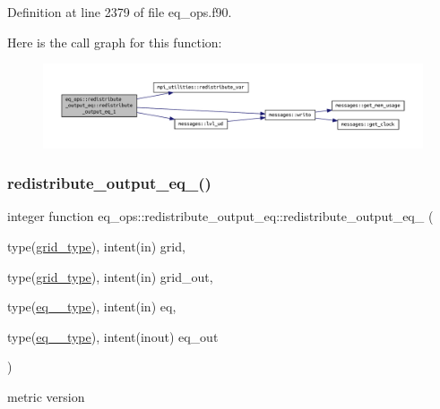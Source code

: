 Definition at line 2379 of file eq\+\_\+ops.\+f90.

Here is the call graph for this function\+:\nopagebreak
\begin{figure}[H]
\begin{center}
\leavevmode
\includegraphics[width=350pt]{interfaceeq__ops_1_1redistribute__output__eq_ac77911cf8c4631896ad2d0fff66e6893_cgraph}
\end{center}
\end{figure}
\mbox{\label{interfaceeq__ops_1_1redistribute__output__eq_afdbe3be15436f6abd965bd301ffd819d}} 
\subsubsection{\texorpdfstring{redistribute\+\_\+output\+\_\+eq\+\_()}{redistribute\_output\_eq\_2()}}
{\footnotesize\ttfamily integer function eq\+\_\+ops\+::redistribute\+\_\+output\+\_\+eq\+::redistribute\+\_\+output\+\_\+eq\+\_ (\begin{DoxyParamCaption}\item[{type(\hyperlink{structgrid__vars_1_1grid__type}{grid\+\_\+type}), intent(in)}]{grid,  }\item[{type(\hyperlink{structgrid__vars_1_1grid__type}{grid\+\_\+type}), intent(in)}]{grid\+\_\+out,  }\item[{type(\hyperlink{structeq__vars_1_1eq__2__type}{eq\+\_\+2\+\_\+type}), intent(in)}]{eq,  }\item[{type(\hyperlink{structeq__vars_1_1eq__2__type}{eq\+\_\+2\+\_\+type}), intent(inout)}]{eq\+\_\+out }\end{DoxyParamCaption})}



metric version 


